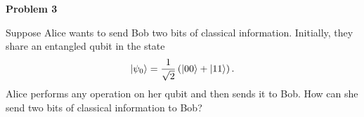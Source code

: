 \documentclass[a4paper,11pt]{article}
\newcommand{\Problem}[1]{
  {
  \vspace*{0.5cm}
  \textsf{\textbf{Problem #1}}
  \vspace*{0.2cm}
  
  }
}
\begin{document}
\Problem 3
Suppose Alice wants to send Bob two bits of classical information. Initially,
they share an entangled qubit in the state
\begin{equation}
\ket{\psi_0} = \frac{1}{\sqrt 2} \left( \ket{00} + \ket{11} \right).
\end{equation}
Alice performs any operation on her qubit and then sends it to Bob. How can she send
two bits of classical information to Bob?
\end{document}
